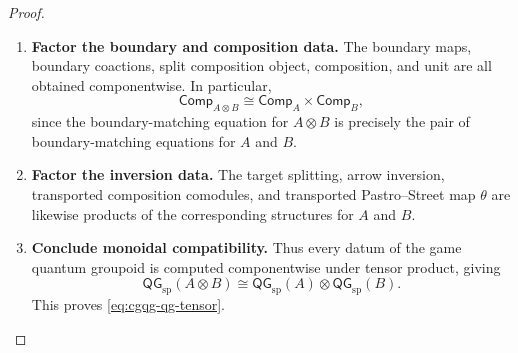 \documentclass[oneside]{article}
\newcommand{\QG}{\mathsf{QG}}
\theoremstyle{plain}
\theoremstyle{definition}
\theoremstyle{remark}
\begin{document}
\begin{proof}
\begin{enumerate}[beginpenalty=10000]
        \item \textbf{Factor the boundary and composition data.} The boundary maps, boundary coactions, split composition object, composition, and unit are all obtained componentwise. In particular,
        \[
            \mathsf{Comp}_{A\otimes B}
            \cong
            \mathsf{Comp}_A\times\mathsf{Comp}_B,
        \]
        since the boundary-matching equation for \(A\otimes B\) is precisely the pair of boundary-matching equations for \(A\) and \(B\).

        \item \textbf{Factor the inversion data.} The target splitting, arrow inversion, transported composition comodules, and transported Pastro--Street map \(\theta\) are likewise products of the corresponding structures for \(A\) and \(B\).

        \item \textbf{Conclude monoidal compatibility.} Thus every datum of the game quantum groupoid is computed componentwise under tensor product, giving
        \[
            \QG_{\mathrm{sp}}(A\otimes B)
            \cong
            \QG_{\mathrm{sp}}(A)\otimes
            \QG_{\mathrm{sp}}(B).
        \]
        This proves \eqref{eq:cgqg-qg-tensor}. \qedhere
    \end{enumerate}
\end{proof}
\end{document}
